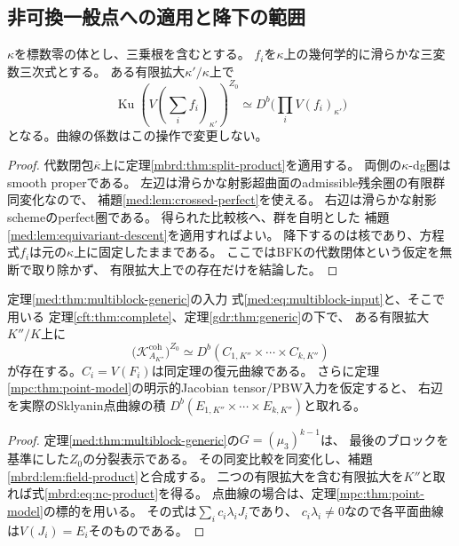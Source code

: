 \subsection{非可換一般点への適用と降下の範囲}

\begin{lemma}[任意の定義体上の有限拡大後の積表示]
\label{mbrd:lem:field-product}
$\kappa$を標数零の体とし、三乗根を含むとする。
$f_i$を$\kappa$上の幾何学的に滑らかな三変数三次式とする。
ある有限拡大$\kappa'/\kappa$上で
\[
 \operatorname{Ku}(V(\textstyle\sum_i f_i)_{\kappa'})^{Z_0}
 \simeq D^b\bigl(\textstyle\prod_i V(f_i)_{\kappa'}\bigr)
\]
となる。曲線の係数はこの操作で変更しない。
\end{lemma}
\begin{proof}
代数閉包$\overline\kappa$上に定理\ref{mbrd:thm:split-product}を適用する。
両側の$\kappa$-dg圏はsmooth properである。
左辺は滑らかな射影超曲面のadmissible残余圏の有限群同変化なので、
補題\ref{med:lem:crossed-perfect}を使える。
右辺は滑らかな射影schemeのperfect圏である。
得られた比較核へ、群を自明とした
補題\ref{med:lem:equivariant-descent}を適用すればよい。
降下するのは核であり、方程式$f_i$は元の$\kappa$上に固定したままである。
ここではBFKの代数閉体という仮定を無断で取り除かず、
有限拡大上での存在だけを結論した。
\end{proof}

\begin{corollary}[全ブロック数の非可換同変残余圏]
\label{mbrd:cor:nc-product}
定理\ref{med:thm:multiblock-generic}の入力
式\eqref{med:eq:multiblock-input}と、そこで用いる
定理\ref{cft:thm:complete}、定理\ref{gdr:thm:generic}の下で、
ある有限拡大$K''/K$上に
\begin{equation}\label{mbrd:eq:nc-product}
 \bigl(\mathcal K^{\mathrm{coh}}_{A_{K''}}\bigr)^{Z_0}
 \simeq D^b(C_{1,K''}\times\cdots\times C_{k,K''})
\end{equation}
が存在する。$C_i=V(F_i)$は同定理の復元曲線である。
さらに定理\ref{mpc:thm:point-model}の明示的Jacobian tensor/PBW入力を仮定すると、
右辺を実際のSklyanin点曲線の積
$D^b(E_{1,K''}\times\cdots\times E_{k,K''})$と取れる。
\end{corollary}
\begin{proof}
定理\ref{med:thm:multiblock-generic}の$G=(\mu_3)^{k-1}$は、
最後のブロックを基準にした$Z_0$の分裂表示である。
その同変比較を同変化し、補題\ref{mbrd:lem:field-product}と合成する。
二つの有限拡大を含む有限拡大を$K''$と取れば式\eqref{mbrd:eq:nc-product}を得る。
点曲線の場合は、定理\ref{mpc:thm:point-model}の標的を用いる。
その式は$\sum_i c_i\lambda_iJ_i$であり、
$c_i\lambda_i\ne0$なので各平面曲線は$V(J_i)=E_i$そのものである。
\end{proof}

